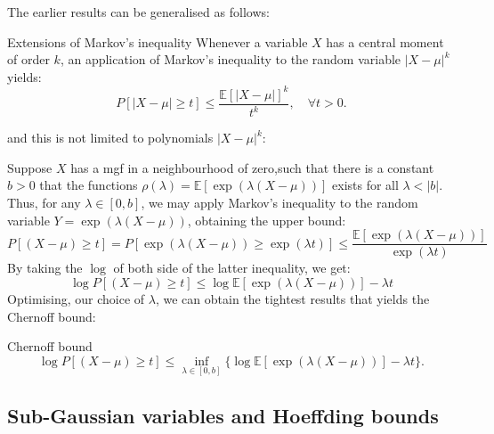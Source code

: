 \documentclass[10pt,handout,english]{beamer}
\newcommand{\E}{\mathbb{E}}
\begin{document}
\begin{frame}[allowframebreaks]
The earlier results can be generalised as follows:
\begin{block}{Extensions of Markov's inequality}
Whenever a variable $X$ has a central moment of order $k$, an application of Markov's inequality to the random variable $\lvert X-\mu\rvert^k$ yields:
\[
P[\lvert X-\mu\rvert\geq t]\leq\frac{\E[\lvert X-\mu \rvert]^k}{t^k},\quad \forall t>0.
\]
\end{block}
and this is not limited to polynomials $\lvert X-\mu \rvert^k $:

Suppose $X$ has a mgf in a neighbourhood of zero,such that there is a constant $b>0$ that the functions $\rho(\lambda)=\E[\exp(\lambda(X-\mu))]$ exists for all $\lambda<\lvert b\rvert$. Thus, for any $\lambda\in[0,b]$, we may apply Markov's inequality to the random variable $Y=\exp(\lambda(X-\mu))$, obtaining the upper bound:
\[
P[(X-\mu)\geq t]=P[\exp(\lambda(X-\mu))\geq \exp(\lambda t)]\leq\frac{\E[\exp(\lambda(X-\mu))]}{\exp(\lambda t)}
\]
By taking the $\log$ of both side of the latter inequality, we get:
\[
\log P[(X-\mu)\geq t]\leq \log\E[\exp(\lambda(X-\mu))]-\lambda t
\]
Optimising, our choice of $\lambda$, we can obtain the tightest results that yields the Chernoff bound:
\begin{block}{Chernoff bound}
\[
\log P[(X-\mu)\geq t]\leq \inf_{\lambda\in [0,b]}\{\log\E[\exp(\lambda(X-\mu))]-\lambda t\}.
\]
\end{block}

\end{frame}


\subsection{Sub-Gaussian variables and Hoeffding bounds}
\frame{\tableofcontents[currentsubsection]}
\end{document}
